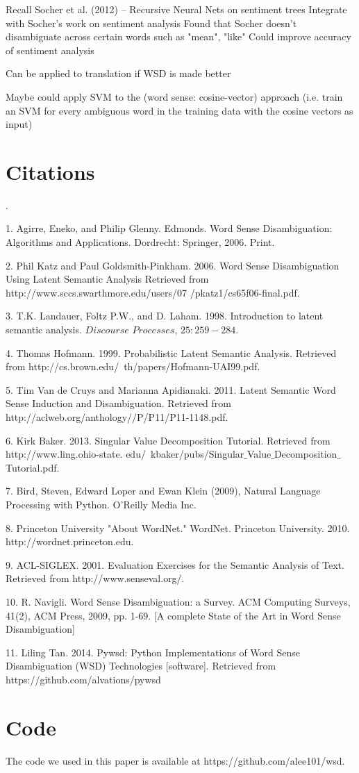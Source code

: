 \documentclass[10pt, letterpaper]{article}
\begin{document}
	Recall Socher et al. (2012) -- Recursive Neural Nets on sentiment trees
	Integrate with Socher's work on sentiment analysis
	Found that Socher doesn't disambiguate across certain words such as "mean", "like"
	Could improve accuracy of sentiment analysis	

	Can be applied to translation if WSD is made better

	Maybe could apply SVM to the (word sense: cosine-vector) approach (i.e. train an SVM 
	for every ambiguous word in the training data with the cosine vectors as input)

	\section{Citations} 
	.

	1. Agirre, Eneko, and Philip Glenny. Edmonds. Word Sense Disambiguation: Algorithms and Applications. Dordrecht: Springer, 2006. Print.

	2. Phil Katz and Paul Goldsmith-Pinkham. 2006. Word Sense Disambiguation Using Latent Semantic Analysis Retrieved from http://www.sccs.swarthmore.edu/users/07 /pkatz1/cs65f06-final.pdf.

	3. T.K. Landauer, Foltz P.W., and D. Laham. 1998. Introduction to latent semantic analysis. $\textit{Discourse Processes}$, $25:259-284$. 

	4. Thomas Hofmann. 1999. Probabilistic Latent Semantic Analysis. Retrieved from http://cs.brown.edu/~th/papers/Hofmann-UAI99.pdf. 

	5. Tim Van de Cruys and Marianna Apidianaki. 2011. Latent Semantic Word Sense Induction and Disambiguation. Retrieved from http://aclweb.org/anthology//P/P11/P11-1148.pdf. 

	6. Kirk Baker. 2013. Singular Value Decomposition Tutorial. Retrieved from http://www.ling.ohio-state. edu/~kbaker/pubs/Singular$\_$Value$\_$Decomposition$\_$Tutorial.pdf. 

	7. Bird, Steven, Edward Loper and Ewan Klein (2009), Natural Language Processing with Python. O’Reilly Media Inc.

	8. Princeton University "About WordNet." WordNet. Princeton University. 2010. http://wordnet.princeton.edu. 

	9. ACL-SIGLEX. 2001. Evaluation Exercises for the Semantic Analysis of Text. Retrieved from http://www.senseval.org/. 

	10. R. Navigli. Word Sense Disambiguation: a Survey. ACM Computing Surveys, 41(2), ACM Press, 2009, pp. 1-69. [A complete State of the Art in Word Sense Disambiguation]

        11. Liling Tan. 2014. Pywsd: Python Implementations of Word Sense Disambiguation (WSD) Technologies [software]. Retrieved from https://github.com/alvations/pywsd

	\section{Code}

	The code we used in this paper is available at https://github.com/alee101/wsd. 




 
\end{document}
